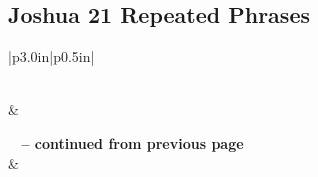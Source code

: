 \subsection{Joshua 21 Repeated Phrases}


\normalsize
 
\begin{center}
\begin{longtable}{|p{3.0in}|p{0.5in}|}
\caption[Joshua 21 Repeated Phrases]{Joshua 21 Repeated Phrases}\label{table:Repeated Phrases Joshua 21} \\
\hline {} &  \\ \hline 
\endfirsthead
 
{{\bfseries \tablename\ \thetable{} -- continued from previous page}} \\  
\hline {} &  \\ \hline 
\endhead
 

\end{longtable}
\end{center}
